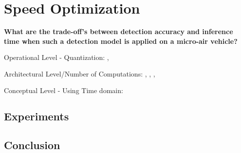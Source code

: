\chapter{Speed Optimization}
\label{sec:tradeoff}
\begin{center}
	\textbf{What are the trade-off's between detection accuracy and inference time when such a detection model is applied on a micro-air vehicle?}
\end{center}

Operational Level - Quantization:
\cite{TripathiSanDiego}, 

Architectural Level/Number of Computations:
\cite{Howard2017}, \cite{Zhang2017a}, \cite{Ghosh2017}, 

Conceptual Level - Using Time domain:
\cite{Chen2018}


\section{Experiments}


\section{Conclusion}